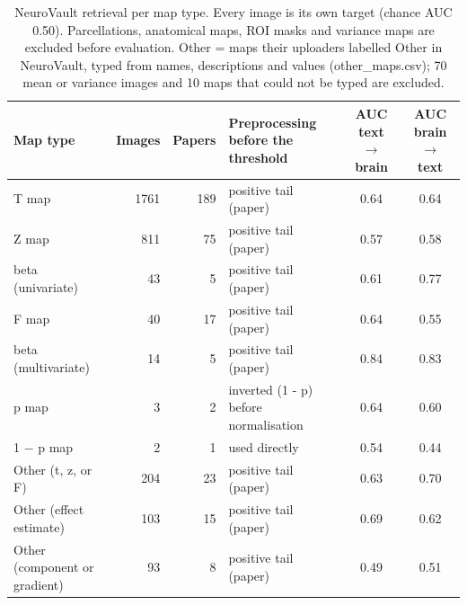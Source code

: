 \begin{table}[ht]
\centering
\footnotesize
\caption{NeuroVault retrieval per map type. Every image is its own target (chance AUC 0.50). Parcellations, anatomical maps, ROI masks and variance maps are excluded before evaluation. Other = maps their uploaders labelled Other in NeuroVault, typed from names, descriptions and values (other_maps.csv); 70 mean or variance images and 10 maps that could not be typed are excluded.}
\label{tab:neurovault_map_types}
\begin{tabular}{lrrlcc}
\toprule
Map type & Images & Papers & Preprocessing before the threshold & AUC text $\rightarrow$ brain & AUC brain $\rightarrow$ text \\
\midrule
T map & 1761 & 189 & positive tail (paper) & 0.64 & 0.64 \\
Z map & 811 & 75 & positive tail (paper) & 0.57 & 0.58 \\
beta (univariate) & 43 & 5 & positive tail (paper) & 0.61 & 0.77 \\
F map & 40 & 17 & positive tail (paper) & 0.64 & 0.55 \\
beta (multivariate) & 14 & 5 & positive tail (paper) & 0.84 & 0.83 \\
p map & 3 & 2 & inverted (1 - p) before normalisation & 0.64 & 0.60 \\
1 $-$ p map & 2 & 1 & used directly & 0.54 & 0.44 \\
Other (t, z, or F) & 204 & 23 & positive tail (paper) & 0.63 & 0.70 \\
Other (effect estimate) & 103 & 15 & positive tail (paper) & 0.69 & 0.62 \\
Other (component or gradient) & 93 & 8 & positive tail (paper) & 0.49 & 0.51 \\
\bottomrule
\end{tabular}
\end{table}
